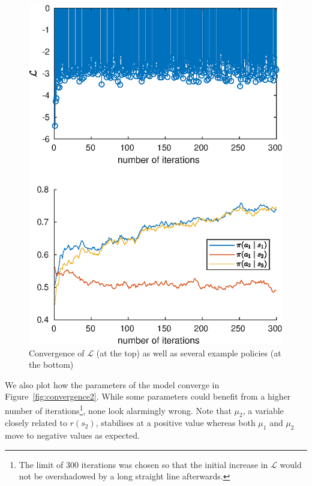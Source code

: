 \documentclass{mpaper}
\begin{document}
\begin{figure}
  \centering
  \includegraphics[width=\columnwidth]{figures/convergence_new}
  \caption{Convergence of $\mathcal{L}$ (at the top) as well as several example
    policies (at the bottom)}
  \label{fig:convergence1}
\end{figure}

We also plot how the parameters of the model converge in
Figure~\ref{fig:convergence2}. While some parameters could benefit from a higher
number of iterations\footnote{The limit of 300 iterations was chosen so that the
  initial increase in $\mathcal{L}$ would not be overshadowed by a long straight
  line afterwards.}, none look alarmingly wrong. Note that $\mu_2$, a variable
closely related to $r(s_2)$, stabilises at a positive value whereas both $\mu_1$
and $\mu_2$ move to negative values as expected.
\end{document}

